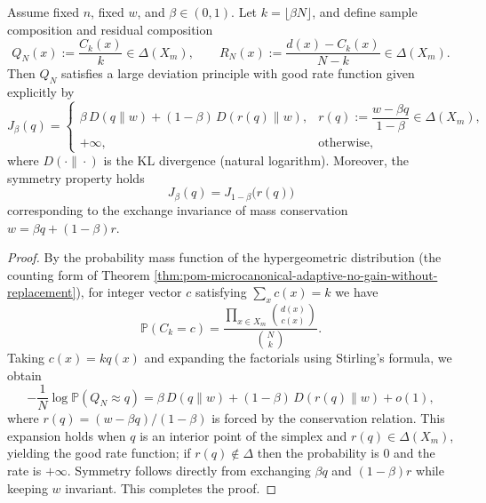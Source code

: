 \begin{theorem}\label{thm:pom-microcanonical-hypergeometric-ldp-kl-sym}
Assume fixed \(n\), fixed \(w\), and \(\beta\in(0,1)\).
Let \(k=\lfloor\beta N\rfloor\), and define sample composition and residual composition
\[
Q_N(x):=\frac{C_k(x)}{k}\in\Delta(X_m),
\qquad
R_N(x):=\frac{d(x)-C_k(x)}{N-k}\in\Delta(X_m).
\]
Then \(Q_N\) satisfies a large deviation principle with good rate function given explicitly by
\[
J_\beta(q)=
\begin{cases}
\beta\,D(q\|w)+(1-\beta)\,D(r(q)\|w), & r(q):=\dfrac{w-\beta q}{1-\beta}\in\Delta(X_m),\\[6pt]
+\infty, & \text{otherwise},
\end{cases}
\]
where \(D(\cdot\|\cdot)\) is the KL divergence (natural logarithm).
Moreover, the symmetry property holds
\[
\boxed{\;
J_\beta(q)=J_{1-\beta}\bigl(r(q)\bigr)\;}
\]
corresponding to the exchange invariance of mass conservation \(w=\beta q+(1-\beta)r\).
\end{theorem}
\begin{proof}
By the probability mass function of the hypergeometric distribution (the counting form of Theorem \ref{thm:pom-microcanonical-adaptive-no-gain-without-replacement}),
for integer vector \(c\) satisfying \(\sum_x c(x)=k\) we have
\[
\mathbb{P}(C_k=c)=\frac{\prod_{x\in X_m}\binom{d(x)}{c(x)}}{\binom{N}{k}}.
\]
Taking \(c(x)=kq(x)\) and expanding the factorials using Stirling's formula, we obtain
\[
-\frac1N\log \mathbb{P}(Q_N\approx q)
=\beta\,D(q\|w)+(1-\beta)\,D(r(q)\|w)+o(1),
\]
where \(r(q)=(w-\beta q)/(1-\beta)\) is forced by the conservation relation.
This expansion holds when \(q\) is an interior point of the simplex and \(r(q)\in\Delta(X_m)\), yielding the good rate function; if \(r(q)\notin\Delta\) then the probability is \(0\) and the rate is \(+\infty\).
Symmetry follows directly from exchanging \(\beta q\) and \((1-\beta)r\) while keeping \(w\) invariant. This completes the proof.
\end{proof}

